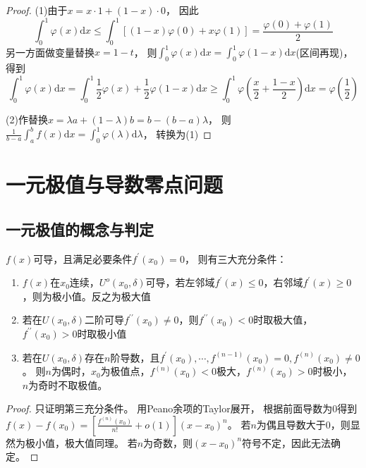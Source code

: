 \begin{proof}
  (1)由于$x = x\cdot 1 + (1 - x)\cdot 0$，
  因此
  \begin{equation*}
    \int_0^1 \varphi(x) \mathrm{d} x \leq
    \int_0^1 \left[ (1-x)\varphi(0) + x \varphi(1) \right]
    = \frac{\varphi(0) + \varphi(1)}{2}
  \end{equation*}
  另一方面做变量替换$x = 1 - t$，
  则$\int_0^1 \varphi(x) \mathrm{d} x = \int_0^1 \varphi(1 - x)\mathrm{d} x$(区间再现)，
  得到
  \begin{equation*}
    \int_0^1 \varphi(x) \mathrm{d} x = \int_0^1 \frac{1}{2}\varphi(x) + \frac{1}{2}\varphi(1 - x) \mathrm{d} x \geq \int_0^1 \varphi \left( \frac{x}{2} + \frac{1 - x}{2} \right) \mathrm{d} x = \varphi \left( \frac{1}{2} \right)
  \end{equation*}

  (2)作替换$x = \lambda a + (1 - \lambda)b = b - (b - a)\lambda$，
  则$\frac{1}{b-a}\int_a^b f(x)\mathrm{d} x = \int_0^1 \varphi(\lambda)\mathrm{d} \lambda$，
  转换为(1)
\end{proof}

\section{一元极值与导数零点问题}

\subsection{一元极值的概念与判定}

\begin{theorem}[一元极值三大充分条件]
  $f(x)$可导，且满足必要条件$f^{\prime}(x_0) = 0$，
  则有三大充分条件：
  \begin{enumerate}
  \item $f(x)$在$x_0$连续，$U^o(x_0,\delta)$可导，若左邻域$f^{\prime}(x) \leq 0$，右邻域$f^{\prime}(x) \geq 0$，则为极小值。反之为极大值
  \item 若在$U(x_0,\delta)$二阶可导$f^{\prime\prime}(x_0) \neq 0$，则$f^{\prime\prime}(x_0) < 0$时取极大值，$f^{\prime\prime}(x_0) > 0$时取极小值
  \item 若在$U(x_0,\delta)$存在$n$阶导数，且$f^{\prime}(x_0),\cdots,f^{(n-1)}(x_0) = 0, f^{(n)}(x_0) \neq 0$。
    则$n$为偶时，$x_0$为极值点，$f^{(n)}(x_0) < 0$极大，$f^{(n)}(x_0) > 0$时极小，
    $n$为奇时不取极值。
  \end{enumerate}
\end{theorem}

\begin{proof}
  只证明第三充分条件。
  用Peano余项的Taylor展开，
  根据前面导数为$0$得到$f(x) - f(x_0) = \left[ \frac{f^{(n)}(x_0)}{n!} + o(1) \right] (x - x_0)^n$。
  若$n$为偶且导数大于$0$，则显然为极小值，极大值同理。
  若$n$为奇数，则$(x - x_0)^n$符号不定，因此无法确定。
\end{proof}





